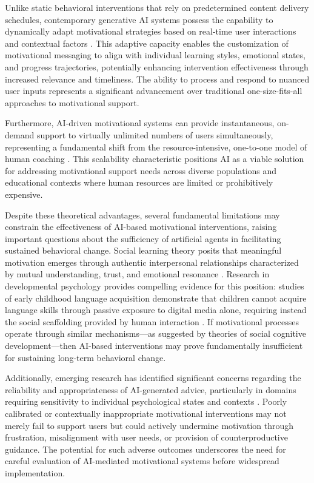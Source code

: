 \documentclass[11pt]{report}
\begin{document}
\begin{mainf}
Unlike static behavioral interventions that rely on predetermined content delivery schedules, contemporary generative AI systems possess the capability to dynamically adapt motivational strategies based on real-time user interactions and contextual factors \citep{bickmore2005relational}. This adaptive capacity enables the customization of motivational messaging to align with individual learning styles, emotional states, and progress trajectories, potentially enhancing intervention effectiveness through increased relevance and timeliness. The ability to process and respond to nuanced user inputs represents a significant advancement over traditional one-size-fits-all approaches to motivational support.

Furthermore, AI-driven motivational systems can provide instantaneous, on-demand support to virtually unlimited numbers of users simultaneously, representing a fundamental shift from the resource-intensive, one-to-one model of human coaching \citep{fitzpatrick2017delivering}. This scalability characteristic positions AI as a viable solution for addressing motivational support needs across diverse populations and educational contexts where human resources are limited or prohibitively expensive.

Despite these theoretical advantages, several fundamental limitations may constrain the effectiveness of AI-based motivational interventions, raising important questions about the sufficiency of artificial agents in facilitating sustained behavioral change. Social learning theory posits that meaningful motivation emerges through authentic interpersonal relationships characterized by mutual understanding, trust, and emotional resonance \citep{bandura1977social}. Research in developmental psychology provides compelling evidence for this position: studies of early childhood language acquisition demonstrate that children cannot acquire language skills through passive exposure to digital media alone, requiring instead the social scaffolding provided by human interaction \citep{kuhl2007foreign}. If motivational processes operate through similar mechanisms—as suggested by theories of social cognitive development—then AI-based interventions may prove fundamentally insufficient for sustaining long-term behavioral change.

Additionally, emerging research has identified significant concerns regarding the reliability and appropriateness of AI-generated advice, particularly in domains requiring sensitivity to individual psychological states and contexts \citep{de2024chatbots}. Poorly calibrated or contextually inappropriate motivational interventions may not merely fail to support users but could actively undermine motivation through frustration, misalignment with user needs, or provision of counterproductive guidance. The potential for such adverse outcomes underscores the need for careful evaluation of AI-mediated motivational systems before widespread implementation.



\end{mainf}
\end{document}
